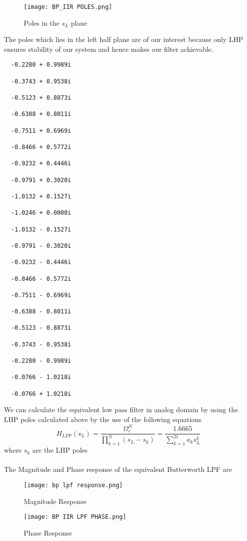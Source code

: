 \documentclass[12pt]{article}
\begin{document}
\begin{figure}[H]
\centering
\texttt{[image: BP\_IIR POLES.png]}
\caption{Poles in the $s_L$ plane}
\label{fig:mesh2}
\end{figure}


The poles which lies in the left half plane are of our interest because only LHP ensures stability of our system and hence makes our filter achievable.

\begin{verbatim}
  -0.2280 + 0.9989i

  -0.3743 + 0.9538i

  -0.5123 + 0.8873i

  -0.6388 + 0.8011i

  -0.7511 + 0.6969i

  -0.8466 + 0.5772i

  -0.9232 + 0.4446i

  -0.9791 + 0.3020i

  -1.0132 + 0.1527i

  -1.0246 + 0.0000i

  -1.0132 - 0.1527i

  -0.9791 - 0.3020i

  -0.9232 - 0.4446i

  -0.8466 - 0.5772i

  -0.7511 - 0.6969i

  -0.6388 - 0.8011i

  -0.5123 - 0.8873i

  -0.3743 - 0.9538i

  -0.2280 - 0.9989i

  -0.0766 - 1.0218i

  -0.0766 + 1.0218i
\end{verbatim}
We can calculate the equivalent low pass filter in analog domain by using the LHP poles calculated above by the use of the following equations\\
\begin{equation*}
    H_{LPF}(s_L) = \frac{\Omega_c^N}{\prod_{k=1}^{N}(s_L-s_k)} = \frac{1.6665}{\sum_{k=1}^{21}a_ks_L^k}
\end{equation*}
where $s_k$ are the LHP poles\\ \\
The Magnitude and Phase response of the equivalent Butterworth LPF are
\begin{figure}[H]
\centering
\texttt{[image: bp lpf response.png]}
\caption{Magnitude Response}
\label{fig:mesh2}
\end{figure}
\begin{figure}[H]
\centering
\texttt{[image: BP IIR LPF PHASE.png]}
\caption{Phase Response}
\label{fig:mesh2}
\end{figure}
\end{document}
